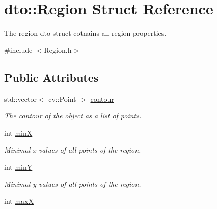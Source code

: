 \hypertarget{structdto_1_1_region}{}\section{dto\+:\+:Region Struct Reference}
\label{structdto_1_1_region}


The region dto struct cotnains all region properties.  




{\ttfamily \#include $<$Region.\+h$>$}

\subsection*{Public Attributes}
\begin{DoxyCompactItemize}
\item 
\mbox{\label{structdto_1_1_region_a1e3427d5faa1acbe5800b471e3509dc1}} 
std\+::vector$<$ cv\+::\+Point $>$ \mbox{\hyperlink{structdto_1_1_region_a1e3427d5faa1acbe5800b471e3509dc1}{contour}}
\begin{DoxyCompactList}\small\item\em The contour of the object as a list of points. \end{DoxyCompactList}\item 
\mbox{\label{structdto_1_1_region_ac4c8872443e50d1cddd7a1d2443c6285}} 
int \mbox{\hyperlink{structdto_1_1_region_ac4c8872443e50d1cddd7a1d2443c6285}{minX}}
\begin{DoxyCompactList}\small\item\em Minimal x values of all points of the region. \end{DoxyCompactList}\item 
\mbox{\label{structdto_1_1_region_a6796cf3967135753850ab2023d5a2372}} 
int \mbox{\hyperlink{structdto_1_1_region_a6796cf3967135753850ab2023d5a2372}{minY}}
\begin{DoxyCompactList}\small\item\em Minimal y values of all points of the region. \end{DoxyCompactList}\item 
\mbox{\label{structdto_1_1_region_a7d0c45cd9d47bc5a9c7eb05fd5920de3}} 
int \mbox{\hyperlink{structdto_1_1_region_a7d0c45cd9d47bc5a9c7eb05fd5920de3}{maxX}}

\end{DoxyCompactItemize}
